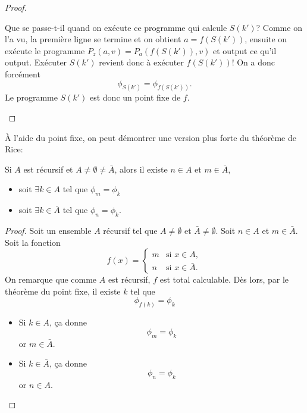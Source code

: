\begin{proof}
\begin{myrem}
          Que se passe-t-il quand on exécute ce programme qui calcule $S(k')$?
          Comme on l'a vu, la première ligne se termine et on obtient
          $a = f(S(k'))$,
          ensuite on exécute le programme $P_z(a,v) = P_a(f(S(k')),v)$
          et output ce qu'il output.
          Exécuter $S(k')$ revient donc à exécuter $f(S(k'))$!
          On a donc forcément
          \[ \phi_{S(k')} = \phi_{f(S(k'))}. \]
          Le programme $S(k')$ est donc un point fixe de $f$.
		\end{myrem}
\end{proof}

\begin{myrem}
  À l'aide du point fixe, on peut démontrer une version plus forte du théorème de Rice:

  Si $A$ est récursif et $A \neq \emptyset \neq \bar{A}$, alors
  il existe $n \in A$ et $m \in \bar{A}$,
  \begin{itemize}
    \item soit $\exists k \in      A $ tel que $\phi_m = \phi_k$
    \item soit $\exists k \in \bar{A}$ tel que $\phi_n = \phi_k$.
  \end{itemize}
  \begin{proof}
    Soit un ensemble $A$ récursif tel que $A \neq \emptyset$ et $\bar{A} \neq \emptyset$.
    Soit $n \in A$ et $m \in \bar{A}$.
    Soit la fonction
    \[
      f(x) =
      \begin{cases}
        m & \text{si }x \in A,\\
        n & \text{si }x \in \bar{A}.
      \end{cases}
    \]
    On remarque que comme $A$ est récursif,
    $f$ est total calculable.
    Dès lors, par le théorème du point fixe, il existe $k$ tel que
    \[ \phi_{f(k)} = \phi_k \]
    \begin{itemize}
      \item Si $k \in A$, ça donne
        \[ \phi_m = \phi_k \]
        or $m \in \bar{A}$.
      \item Si $k \in \bar{A}$, ça donne
        \[ \phi_n = \phi_k \]
        or $n \in A$.
    \end{itemize}
  \end{proof}
\end{myrem}

